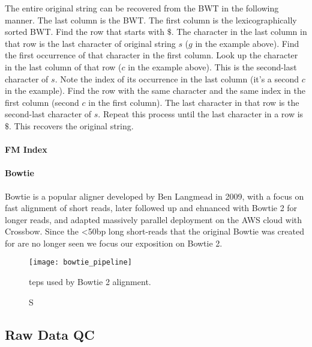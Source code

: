 The entire original string can be recovered from the BWT in the following manner. The last column is the BWT. The first column is the lexicographically sorted BWT. Find the row that starts with $\$$. The character in the last column in that row is the last character of original string $s$ ($g$ in the example above). Find the first occurrence of that character in the first column. Look up the character in the last column of that row ($c$ in the example above). This is the second-last character of $s$. Note the index of its occurrence in the last column (it's a second $c$ in the example). Find the row with the same character and the same index in the first column (second $c$ in the first column). The last character in that row is the second-last character of $s$. Repeat this process until the last character in a row is $\$$. This recovers the original string.

\paragraph{FM Index}

\paragraph{Bowtie}

Bowtie is a popular aligner developed by Ben Langmead in 2009, with a focus on fast alignment of short reads\autocite{langmead2009ultrafast}, later followed up and ehnanced with Bowtie 2 for longer reads\autocite{langmead2012fast}, and adapted massively parallel deployment on the AWS cloud with Crossbow\autocite{langmead2009searching}. Since the <50bp long short-reads that the original Bowtie was created for are no longer seen we focus our exposition on Bowtie 2.

\begin{figure}[H]
    \texttt{[image: bowtie\_pipeline]}
    \centering
    \caption Steps used by Bowtie 2 alignment.\autocite{langmead2012fast}
    \label{fig:bowtie_pipeline}
\end{figure}




\subsection{Raw Data QC}
\label{sec:bg_raw_data_qc}

